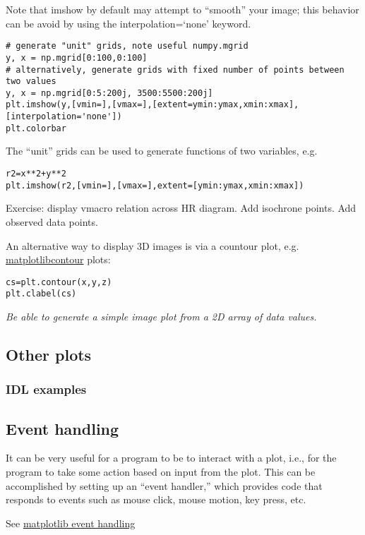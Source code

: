 \documentclass{article}
\newcommand{\test}[1]{%
    \begin{center}
        \colorbox{hl}{\parbox{0.9\textwidth}{\emph{\centering #1}}}
    \end{center}}
\begin{document}
Note that imshow by default may attempt to ``smooth'' your image; this
behavior can be avoid by using the interpolation=`none' keyword.
\begin{verbatim}
# generate "unit" grids, note useful numpy.mgrid
y, x = np.mgrid[0:100,0:100]
# alternatively, generate grids with fixed number of points between two values
y, x = np.mgrid[0:5:200j, 3500:5500:200j]
plt.imshow(y,[vmin=],[vmax=],[extent=ymin:ymax,xmin:xmax],[interpolation='none'])
plt.colorbar
\end{verbatim}
The ``unit'' grids can be used to generate functions of two variables,
e.g.
\begin{verbatim}
r2=x**2+y**2
plt.imshow(r2,[vmin=],[vmax=],extent=[ymin:ymax,xmin:xmax])
\end{verbatim}
Exercise: display vmacro relation across HR diagram. Add isochrone
points. Add observed data points.

An alternative way to display 3D images is via a countour plot, e.g.
\href{http://matplotlib.org/examples/pylab_examples/contour_demo.html}
{matplotlibcontour} plots:
\begin{verbatim}
cs=plt.contour(x,y,z)
plt.clabel(cs)
\end{verbatim}

\test{Be able to generate a simple image plot from a 2D array of data
values.}

\subsection{Other plots}
\subsubsection{IDL examples}
\subsection{Event handling}
It can be very useful for a program to be to interact with a plot,
i.e., for the program to take some action based on input from the
plot. This can be accomplished by setting up an ``event handler,''
which provides code that responds to events such as mouse click, mouse
motion, key press, etc.

See \href{http://matplotlib.org/users/event_handling.html}
{matplotlib event handling}
\end{document}
